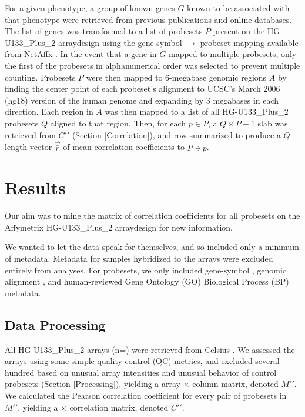 \documentclass{article}
\begin{document}
For a given phenotype, a group of known genes $G$ known to be associated with
that phenotype were retrieved from previous publications and online databases.
The list of genes was transformed to a list of probesets $P$ present on the
HG-U133\_Plus\_2 arraydesign using the gene symbol $\rightarrow$ probeset
mapping available from NetAffx \cite{netaffx}.  In the event that a gene in $G$ mapped to
multiple probesets, only the first of the probesets in alphanumerical order was
selected to prevent multiple counting.  Probesets $P$ were then mapped to
6-megabase genomic regions $A$ by finding the center point of each probeset's
alignment to UCSC's March 2006 (hg18) version of the human genome and expanding
by 3 megabases in each direction.  Each region in $A$ was then mapped to a list
of all HG-U133\_Plus\_2 probesets $Q$ aligned to that region.  Then, for each
$p{\in}P$, a $Q{\times}P-1$ slab was retrieved from $C\prime\prime$ (Section
\ref{Correlation}), and row-summarized to produce a $Q$-length vector
$\vec{\bar{r}}$ of mean correlation coefficients to $P{\ni}p$.

\section{Results}\label{Results}

Our aim was to mine the matrix of correlation coefficients for all probesets on
the Affymetrix HG-U133\_Plus\_2 arraydesign for new information.

We wanted to let the data speak for themselves, and so included only a minimum
of metadata.  Metadata for samples hybridized to the arrays were excluded
entirely from analyses.  For probesets, we only included gene-symbol
\cite{netaffx}, genomic alignment \cite{karolchik}, and human-reviewed Gene
Ontology (GO) Biological Process (BP) \cite{go, bioconductor} metadata.

\subsection{Data Processing}\label{Processing Results}
All HG-U133\_Plus\_2 arrays (n=) were retrieved from Celsius
\cite{celsius}.  We assessed the arrays using some simple quality control (QC)
metrics, and excluded several hundred based on unusual array intensities and
unusual behavior of control probesets (Section \ref{Processing}), yielding a
 array $\times$  column matrix, denoted
$M\prime\prime$.  We calculated the Pearson correlation coefficient for every
pair of probesets in $M\prime\prime$, yielding a  $\times$
 correlation matrix, denoted $C\prime\prime$.
\end{document}
